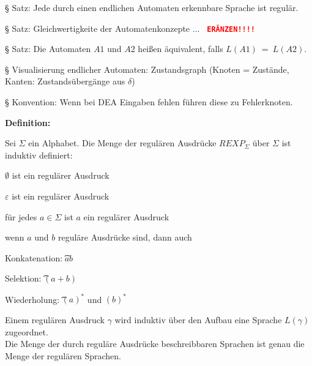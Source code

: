 \documentclass[11pt,
			a4paper,
			parskip=full,
			toc=bib,
			toc=idx,
			toc=listof,
			ngerman
			listof=totoc,]{scrartcl}
\newcommand{\ergaenzen}[1]{%
	\tt{%
		\textbf{%
				\textcolor{red}{#1}%
		}%
	}%
	\rm%
}
\newcommand{\concept}[1]{%
	\sf{%
		\textbf{%
				\textcolor{mymauve}{#1}%
		}%
	}%
	\rm%
}
\newenvironment{objDef}[1]%
{	\begin{framed}
	\textbf{Definition:} \concept{#1}
	\compress}%
{\end{framed}}
\newenvironment{cmt}%
{\color{mygray} § }
{\color{black}}
\newenvironment{expl}%
{\color{red}}
{\color{black}}
\newcommand{\compress}{\vspace{-1em}}
\begin{document}

\compress
\begin{cmt}
Satz: Jede durch einen endlichen Automaten erkennbare Sprache ist regulär.
\end{cmt}

\compress
\begin{cmt}
Satz: Gleichwertigkeite der Automatenkonzepte ...
\ergaenzen{ERÄNZEN!!!!}
\end{cmt}

\compress
\begin{cmt}
Satz: Die Automaten $A1$ und $A2$ heißen äquivalent, falls $L(A1) ~ = ~ L(A2)$.
\end{cmt}

\compress
\begin{cmt}
Visualisierung endlicher Automaten: Zustandsgraph (Knoten = Zustände, Kanten: Zustandsübergänge aus $δ$)
\end{cmt}

\compress
\begin{cmt}
Konvention: Wenn bei DEA Eingaben fehlen führen diese zu Fehlerknoten.
\end{cmt}






\newpage
\begin{objDef}{Regulärer Ausdruck}

Sei $Σ$ ein Alphabet. Die Menge der regulären Ausdrücke $REXP_Σ$ über $Σ$ ist 
induktiv definiert:
\compress
\begin{compactitem} 
  \item $∅$ ist ein regulärer Ausdruck
  \item $ε$ ist ein regulärer Ausdruck
  \item für jedes $a ∈ Σ $ ist $a$ ein regulärer Ausdruck
  \item wenn $a$ und $b$ reguläre Ausdrücke sind, dann auch
  \begin{compactitem}
    \item Konkatenation: \t $ab$
    \item Selektion:     \t $(a+b)$
    \item Wiederholung:  \t $(a)^*$ und $(b)^*$
  \end{compactitem}
\end{compactitem}
\compress
Einem regulären Ausdruck $γ$ wird induktiv über den Aufbau eine Sprache  $L(γ)$ zugeordnet.\\
Die Menge der durch reguläre Ausdrücke beschreibbaren Sprachen ist genau die Menge der regulären Sprachen.
\end{objDef}
\end{document}
